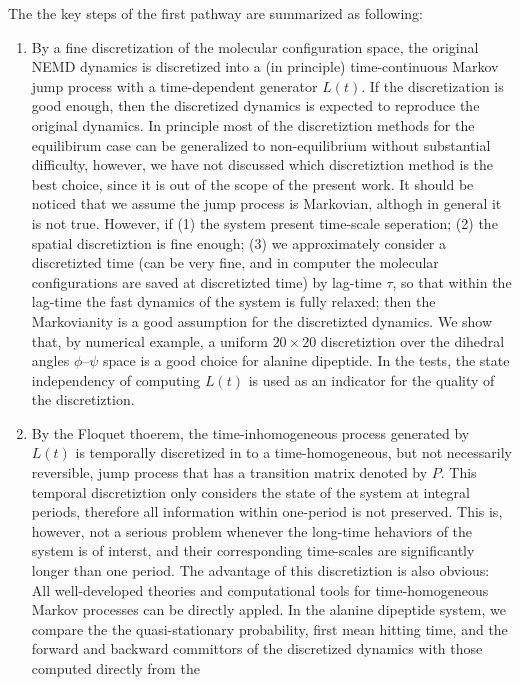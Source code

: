 \documentclass[aps, pre, preprint,unsortedaddress,a4paper,onecolumn]{revtex4}
\newcommand{\recheck}[1]{{\color{red} #1}}
\begin{document}
The the key steps of the first pathway are
summarized as following:
\begin{enumerate}
\item By a fine discretization of the molecular configuration space,
  the original NEMD dynamics is discretized into a (in principle)
  time-continuous \recheck{Markov} jump process with a time-dependent generator $L(t)$.
  If the discretization is good enough, then the discretized
  dynamics is expected to reproduce the original dynamics.
  In principle most of the discretiztion methods for the
  equilibirum case can be generalized to  non-equilibrium without
  substantial difficulty, however,
  we have not discussed which discretiztion method is the best choice,
  since it is out of the scope of the present work.
  \recheck{It should be noticed that
    we assume the jump process is Markovian, althogh in
    general it is not true. However, if (1) the system present time-scale
    seperation; (2) the spatial discretiztion is fine enough; (3)
    we approximately consider a discretizted time
    (can be very fine, and in computer the molecular configurations are
    saved at discretizted time)
    by lag-time $\tau$, so that within the lag-time
    the fast dynamics of the system is fully relaxed; then
    the Markovianity is a good assumption for the discretizted dynamics.
  }
  We show that, by numerical example, a uniform $20\times20$ discretiztion 
  over the dihedral angles $\phi$--$\psi$ space is a good choice for
  alanine dipeptide.
  In the tests, the state independency of computing $L(t)$
  is used as an indicator for
  the quality of the discretiztion.
\item By the Floquet thoerem, the time-inhomogeneous process generated
  by $L(t)$ is temporally discretized in to a time-homogeneous,
  but not necessarily reversible, jump process that has a transition
  matrix denoted by $P$. This temporal discretiztion only  considers
  the state of the system at integral periods, therefore all information
  within one-period is not preserved. This is, however, not a serious
  problem whenever the long-time hehaviors of the system is of interst, and
  their corresponding time-scales are significantly longer than one period.
  The advantage of this discretiztion
  is also obvious: All well-developed theories and computational tools
  for time-homogeneous Markov processes
  can be directly appled. In the
  alanine dipeptide system, we compare
  the the quasi-stationary probability,
  first mean hitting time, and the forward and backward committors
  of the discretized dynamics with those computed directly from the

\end{enumerate}
\end{document}
